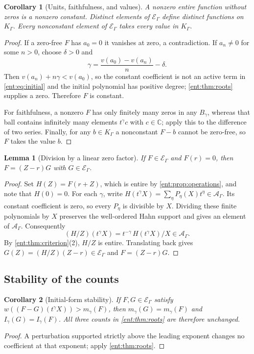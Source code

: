 \documentclass[11pt]{article}
\theoremstyle{plain}
\newtheorem{lemma}[lemma]{Lemma}
\theoremstyle{plain}
\theoremstyle{plain}
\newtheorem{corollary}[corollary]{Corollary}
\theoremstyle{definition}
\theoremstyle{definition}
\theoremstyle{definition}
\theoremstyle{definition}
\theoremstyle{remark}
\newcommand{\C}{\mathbb C}\newcommand{\R}{\mathbb R}
\newcommand{\K}{K_\Gamma}\newcommand{\KD}{K_\Delta}
\newcommand{\E}{\mathcal E_\Gamma}
\newcommand{\A}{\mathcal A_\Gamma}\newcommand{\OO}{\mathcal O_\Gamma}
\begin{document}
\begin{corollary}[Units, faithfulness, and values]\label{ent:cor:units}
A nonzero entire function without zeros is a nonzero constant. Distinct
elements of $\E$ define distinct functions on $\K$. Every nonconstant element
of $\E$ takes every value in $\K$.
\end{corollary}
\begin{proof}
If a zero-free $F$ has $a_0=0$ it vanishes at zero, a contradiction. If
$a_n\ne0$ for some $n>0$, choose $\delta>0$ and
\[
 \gamma=\frac{v(a_0)-v(a_n)}{n}-\delta.
\]
Then $v(a_n)+n\gamma<v(a_0)$, so the constant coefficient is not an active
term in \eqref{ent:eq:initial} and the initial polynomial has positive
degree; \cref{ent:thm:roots} supplies a zero. Therefore $F$ is constant.

For faithfulness, a nonzero $F$ has only finitely many zeros in any
$B_\gamma$, whereas that ball contains infinitely many elements $t^\gamma c$
with $c\in\C$; apply this to the difference of two series. Finally, for any
$b\in\K$ a nonconstant $F-b$ cannot be zero-free, so $F$ takes the value $b$.
\end{proof}

\begin{lemma}[Division by a linear zero factor]\label{ent:lem:linear-division}
If $F\in\E$ and $F(r)=0$, then $F=(Z-r)G$ with $G\in\E$.
\end{lemma}
\begin{proof}
Set $H(Z)=F(r+Z)$, which is entire by \cref{ent:prop:operations}, and note
that $H(0)=0$. For each $\gamma$, write
$H(t^\gamma X)=\sum_\eta P_\eta(X)t^\eta\in\A$.
Its constant coefficient is zero, so every $P_\eta$ is divisible by $X$.
Dividing these finite polynomials by $X$ preserves the well-ordered Hahn
support and gives an element of $\A$. Consequently
\[
 (H/Z)(t^\gamma X)=t^{-\gamma}\,H(t^\gamma X)/X\in\A.
\]
By \cref{ent:thm:criterion}(2), $H/Z$ is entire. Translating back gives
$G(Z)=(H/Z)(Z-r)\in\E$ and $F=(Z-r)G$.
\end{proof}

\subsection{Stability of the counts}
\begin{corollary}[Initial-form stability]\label{ent:cor:stability}
If $F,G\in\E$ satisfy $w((F-G)(t^\gamma X))>m_\gamma(F)$, then
$m_\gamma(G)=m_\gamma(F)$ and $I_\gamma(G)=I_\gamma(F)$. All three counts in
\cref{ent:thm:roots} are therefore unchanged.
\end{corollary}
\begin{proof}
A perturbation supported strictly above the leading exponent changes no
coefficient at that exponent; apply \cref{ent:thm:roots}.
\end{proof}
\end{document}
